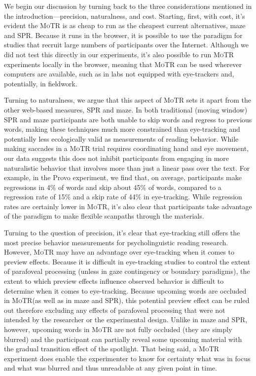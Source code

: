 \documentclass[12pt]{article}
\newcommand{\motr}{\textsc{MoTR}\xspace}
\begin{document}
{We begin our discussion by turning back to the three considerations mentioned in the introduction---precision, naturalness, and cost. Starting, first, with cost, it’s evident the \motr is as cheap to run as the cheapest current alternatives, maze and SPR. Because it runs in the browser, it is possible to use the paradigm for studies that recruit large numbers of participants over the Internet. Although we did not test this directly in our experiments, it’s also possible to run \motr experiments locally in the browser, meaning that \motr can be used wherever computers are available, such as in labs not equipped with eye-trackers and, potentially, in fieldwork.

Turning to naturalness, we argue that this aspect of \motr sets it apart from the other web-based measures, SPR and maze. In both traditional (moving window) SPR and maze participants are both unable to skip words and regress to previous words, making these techniques much more constrained than eye-tracking and potentially less ecologically valid as measurements of reading behavior. While making saccades in a \motr trial requires coordinating hand and eye movement, our data suggests this does not inhibit participants from engaging in more naturalistic behavior that involves more than just a linear pass over the text. For example, in the Provo experiment, we find that, on average, participants make regressions in 4\% of words and skip about 45\% of words, compared to a regression rate of 15\% and a skip rate of 44\% in eye-tracking. While regression rates are certainly lower in \motr, it’s also clear that participants take advantage of the paradigm to make flexible scanpaths through the materials.

Turning to the question of precision, it's clear that eye-tracking still offers the most precise behavior measurements for psycholinguistic reading research. However, \motr may have an advantage over eye-tracking when it comes to preview effects. Because it is difficult in eye-tracking studies to control the extent of parafoveal processing (unless in gaze contingency or boundary paradigms), the extent to which preview effects influence observed behavior is difficult to determine when it comes to eye-tracking. Because upcoming words are occluded in \motr (as well as in maze and SPR), this potential preview effect can be ruled out therefore excluding any effects of parafoveal processing that were not intended by the researcher or the experimental design. Unlike in maze and SPR, however, upcoming words in \motr are not fully occluded (they are simply blurred) and the participant can partially reveal some upcoming material with the gradual transition effect of the spotlight. That being said, a \motr experiment does enable the experimenter to know for certainty what was in focus and what was blurred and thus unreadable at any given point in time.

}
\end{document}
